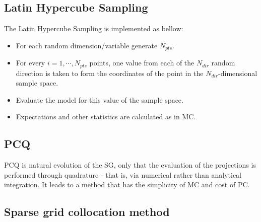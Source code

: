 \documentclass{article}
\begin{document}
\subsection{Latin Hypercube Sampling}
The Latin Hypercube Sampling is implemented as bellow:
\begin{itemize}
\item For each random dimension/variable generate $N_{pts}$.
\item For every $i=1,\cdots,N_{pts}$ points, one value from each of the $N_{dir}$ random direction is taken
to form the coordinates of the point in the $N_{dir}$-dimensional sample space.
\item Evaluate the model for this value of the sample space.
\item Expectations and other statistics are calculated as in MC. 
\end{itemize}

\subsection{PCQ}
PCQ is natural evolution of the SG, only that the evaluation of the projections is performed 
through quadrature - that is, via numerical rather than analytical integration. 
It leads to a method that has the simplicity of MC and cost of PC. 
\subsection{Sparse grid collocation method}
\end{document}
